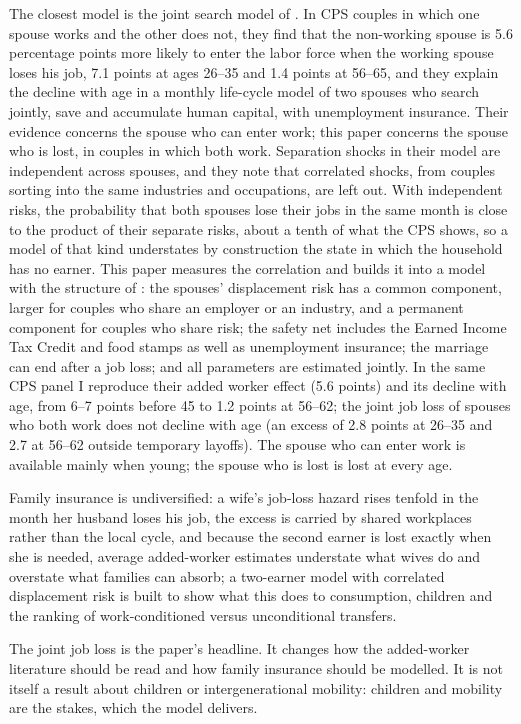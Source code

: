 The closest model is the joint search model of \citet{bacher2025joint}. In CPS couples in which one spouse works and the
other does not, they find that the non-working spouse is 5.6 percentage points more likely to enter the labor force
when the working spouse loses his job, 7.1 points at ages 26--35 and 1.4 points at 56--65, and they explain the decline
with age in a monthly life-cycle model of two spouses who search jointly, save and accumulate human capital, with
unemployment insurance. Their evidence concerns the spouse who can enter work; this paper concerns the spouse who is
lost, in couples in which both work. Separation shocks in their model are independent across spouses, and they note
that correlated shocks, from couples sorting into the same industries and occupations, are left out. With independent
risks, the probability that both spouses lose their jobs in the same month is close to the product of their separate
risks, about a tenth of what the CPS shows, so a model of that kind understates by construction the state in which the
household has no earner. This paper measures the correlation and builds it into a model with the structure of
\citet{bacher2025joint}: the spouses' displacement risk has a common component, larger for couples who share an employer
or an industry, and a permanent component for couples who share risk; the safety net includes the Earned Income Tax
Credit and food stamps as well as unemployment insurance; the marriage can end after a job loss; and all parameters are
estimated jointly. In the same CPS panel I reproduce their added worker effect (5.6 points) and its decline with age, from 6--7 points
before 45 to 1.2 points at 56--62; the joint job loss of spouses who both work does not decline with age (an excess of
2.8 points at 26--35 and 2.7 at 56--62 outside temporary layoffs). The spouse who can enter work is available mainly
when young; the spouse who is lost is lost at every age.

Family insurance is undiversified: a wife's job-loss hazard rises tenfold in the month her husband loses his job, the
excess is carried by shared workplaces rather than the local cycle, and because the second earner is lost exactly
when she is needed, average added-worker estimates understate what wives do and overstate what families can absorb; a
two-earner model with correlated displacement risk is built to show what this does to consumption, children and the
ranking of work-conditioned versus unconditional transfers.

The joint job loss is the paper's headline. It changes how the added-worker literature should be read and how family
insurance should be modelled. It is not itself a result about children or intergenerational mobility: children and
mobility are the stakes, which the model delivers.

